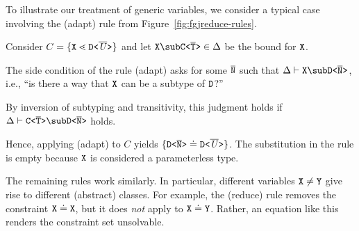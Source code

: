 \begin{example}\label{item:3}
  To illustrate our treatment of generic variables, we consider a
  typical case involving the (adapt) rule from
  Figure~\ref{fig:fgjreduce-rules}.

  Consider $C = \{  {\tt X} \lessdot \mathtt{D \texttt{<} \overline{\mathit{U}} \texttt{>} }  \}$ and let $
  \mv{X} \sub \exptype{C}{\ol{T}} \in \Delta$ be the bound for
  ${\tt X}$.

  The side condition of the rule (adapt) asks for some $\overline{\tt N}$ such
  that
  $\Delta \vdash \mv{X} \sub \exptype{D}{\ol{N}}$, i.e., ``is there a
  way that ${\tt X}$ can be a subtype of ${\tt D}$?''

  By inversion of subtyping and transitivity, this judgment holds if
  $\Delta \vdash \exptype{C}{\ol{T}} \sub \exptype{D}{\ol{N}}$ holds.

  Hence, applying (adapt) to $C$ yields $\{  \mathtt{D \texttt{<} \overline{\tt N} \texttt{>} } \doteq
    \mathtt{D \texttt{<} \overline{\mathit{U}} \texttt{>} }  \}$. The substitution in the rule is empty
  because ${\tt X}$ is considered a parameterless type.

  The remaining rules work similarly. In particular, different
  variables ${\tt X} \ne {\tt Y}$ give rise to different (abstract)
  classes. For example, the (reduce) rule removes the constraint ${\tt X} \doteq
  {\tt X}$, but it does \emph{not} apply to
  ${\tt X} \doteq {\tt Y}$. Rather, an equation like this renders the
  constraint set unsolvable.
\end{example}

